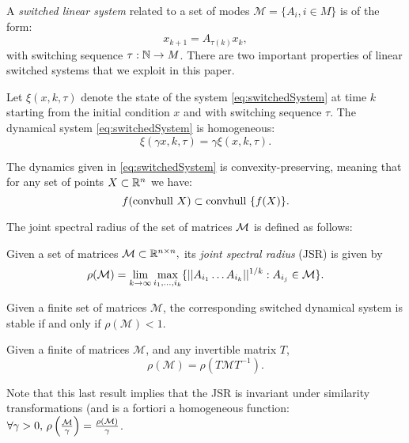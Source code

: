 A \emph{switched linear system} related to a set of modes $\mathcal{M}= \{A_i, i \in M \}$ is of the form:
\begin{equation}\label{eq:switchedSystem}x_{k+1} = A_{\tau(k)}x_k,\end{equation}
with switching sequence $\tau: \mathbb{N} \to M$. There are two important properties of linear switched systems that we exploit in this paper.
\begin{property}\label{property:homogeneity}
Let $\xi(x, k, \tau)$ denote the state of the system \eqref{eq:switchedSystem} at time $k$ starting from the initial condition $x$ and with switching sequence $\tau$. The dynamical system \eqref{eq:switchedSystem} is homogeneous:
$$\xi(\gamma x, k, \tau)= \gamma \xi(x, k, \tau). $$
\end{property}
\begin{property}\label{property:convpres}
The dynamics given in \eqref{eq:switchedSystem} is convexity-preserving, meaning that for any set of points $X \subset \mathbb{R}^n$ we have:
$$ f(\mbox{convhull }{X})\subset \mbox{convhull }\{f(X)\}. $$
\end{property}

The joint spectral radius of the set of matrices $\mathcal{M}$ is defined as follows:
\begin{definition} \cite{jungers_lncis} Given a set of matrices $\mathcal{M} \subset \mathbb{R}^{n\times n},$ its \emph{joint spectral radius} (JSR) is given by
$$\rho(\mathcal{M}) =\lim_{k\rightarrow \infty} \max_{i_1,\dots, i_k}\{||A_{i_1} \dots A_{i_k}||^{1/k}: A_{i_j}\in\mathcal{M}\}. $$
\end{definition}

\begin{property}
Given a finite set of matrices $\mathcal{M}$, the corresponding switched dynamical system is stable if and only if $\rho(\mathcal{M})<1$.
\end{property}

\begin{property}\label{rem:scaling}
Given a finite of matrices $\mathcal{M}$, and any invertible matrix $T$, 
$$\rho(\mathcal{M})=\rho(T \mathcal{M} T^{-1}).$$
\end{property}

Note that this last result implies that the JSR is invariant under similarity transformations (and is a fortiori a homogeneous function: $\forall \gamma > 0,\, \rho\left(\frac{\mathcal{M}}{\gamma}\right)=\frac{\rho(\mathcal{M})}{\gamma}$.
